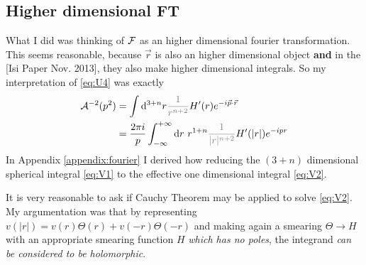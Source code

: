 \documentclass[10pt,a4paper, fleqn]{article}
\begin{document}
\subsection{Higher dimensional FT}
What I did was thinking of ${\cal F}$ as an higher dimensional fourier transformation. This seems reasonable, because $\vec r$ is also an higher dimensional object {\bf and} in the [Isi Paper Nov. 2013], they also make higher dimensional integrals. So my interpretation of \eqref{eq:U4} was exactly
%
\begin{subequations}
\begin{align}
\CA^{-2}(p^2) &= \int \d^{3+n}r \mathcolor{gray}{\frac 1{r^{n+2}}} H'(r) e^{-i \vec p \cdot \vec r}
\label{eq:V1}
\\
&= \frac{2\pi i}p \int_{-\infty}^{+\infty} \d r~r^{1+n} \mathcolor{gray}{\frac 1{|r|^{n+2}}} H'(|r|) e^{-i p r}
\label{eq:V2}
\end{align}
\end{subequations}
%
In Appendix \ref{appendix:fourier} I derived how reducing the $(3+n)$ dimensional spherical integral \eqref{eq:V1} to the effective one dimensional integral \eqref{eq:V2}.

It is very reasonable to ask if Cauchy Theorem may be applied to solve \eqref{eq:V2}. My argumentation was that by representing $v(|r|)=v(r)\Theta(r) + v(-r)\Theta(-r)$ and making again a smearing $\Theta \to H$ with an appropriate smearing function $H$ {\it which has no poles}, the integrand {\it can be considered to be holomorphic}.
\end{document}

